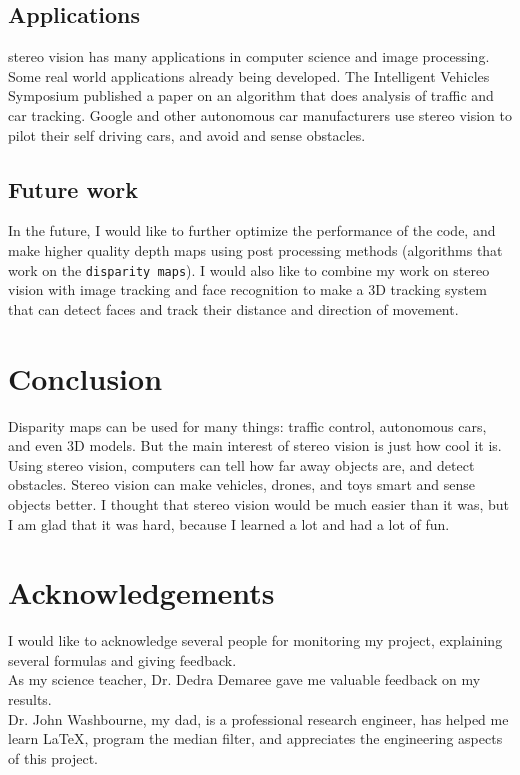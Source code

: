 \documentclass[11pt,fleqn]{article}
\begin{document}
\subsection{Applications}

stereo vision has many applications in computer science and image processing. Some real world applications already being developed. The Intelligent Vehicles Symposium published a paper on an algorithm that does analysis of traffic and car tracking. Google and other autonomous car manufacturers use stereo vision to pilot their self driving cars, and avoid and sense obstacles.

\subsection{Future work}

In the future, I would like to further optimize the performance of the code, and  make higher quality depth maps using post processing methods (algorithms that work on the \texttt{disparity maps}). I would also like to combine my work on stereo vision with image tracking and face recognition to make a 3D tracking system that can detect faces and track their distance and direction of movement.


\section{Conclusion}

Disparity maps can be used for many things: traffic control, autonomous cars, and even 3D models. But the main interest of stereo vision is just how cool it is. Using stereo vision, computers can tell how far away objects are, and detect obstacles. Stereo vision can make vehicles, drones, and toys smart and sense objects better. I thought that stereo vision would be much easier than it was, but I am glad that it was hard, because I learned a lot and had a lot of fun.


\section{Acknowledgements}

I would like to acknowledge several people for monitoring my project, explaining several formulas and giving feedback.\\[5pt]
%
As my science teacher, Dr. Dedra Demaree gave me valuable feedback on my results.\\[5pt]
%
Dr. John Washbourne, my dad, is a professional research engineer, has helped me learn LaTeX, program the median filter, and appreciates the engineering aspects of this project.
\end{document}
